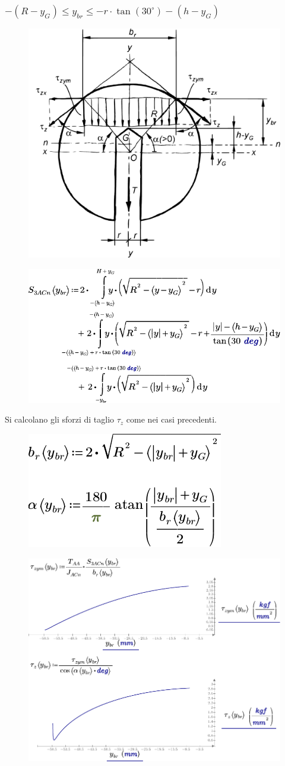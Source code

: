 \subsubsection{$-(R-y_G) \leq y_{br} \leq -r \cdot \tan(30^\circ)-(h-y_G)$}
\begin{figure}[H]
\centering
  \includegraphics[width=.4\textwidth]{imgs/Cap7/SezAsse12}
\caption{}
\label{fig:SezAsse12}
\end{figure}
\begin{figure}[H]
\centering
  \includegraphics[width=.6\textwidth]{imgs/MathAsse6_0}
\caption{}
\label{fig:MathAsse6_0}
\end{figure}
Si calcolano gli sforzi di taglio $\tau_z$ come nei casi precedenti. 
\begin{figure}[H]
\centering
  \includegraphics[width=.25\textwidth]{imgs/MathAsse6_1}
\caption{}
\label{fig:MathAsse6_1}
\end{figure}
\begin{figure}[H]
\centering
  \includegraphics[width=.75\textwidth]{imgs/MathAsse6_2}
\caption{}
\label{fig:MathAsse6_2}
\end{figure}
